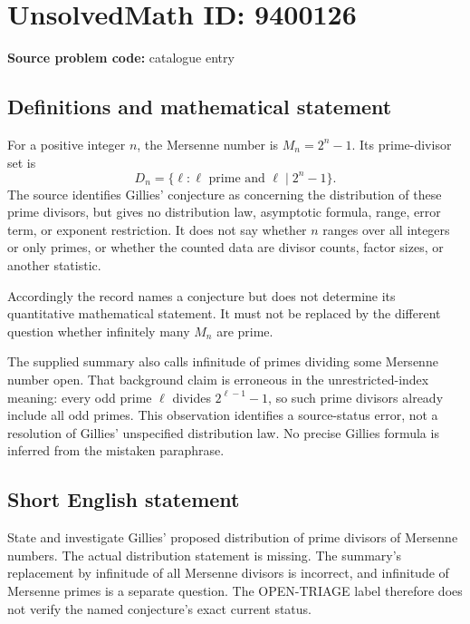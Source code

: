 \documentclass[11pt]{article}
\begin{document}
\section*{UnsolvedMath ID: 9400126}
\textbf{Source problem code:} catalogue entry
\subsection{Definitions and mathematical statement}
For a positive integer $n$, the Mersenne number is $M_n=2^n-1$. Its prime-divisor set is
\[
 D_n=\{\ell:\ell\text{ prime and }\ell\mid2^n-1\}.
\]
The source identifies Gillies' conjecture as concerning the distribution of these prime divisors, but gives no distribution law, asymptotic formula, range, error term, or exponent restriction. It does not say whether $n$ ranges over all integers or only primes, or whether the counted data are divisor counts, factor sizes, or another statistic.

Accordingly the record names a conjecture but does not determine its quantitative mathematical statement. It must not be replaced by the different question whether infinitely many $M_n$ are prime.

The supplied summary also calls infinitude of primes dividing some Mersenne number open. That background claim is erroneous in the unrestricted-index meaning: every odd prime $\ell$ divides $2^{\ell-1}-1$, so such prime divisors already include all odd primes. This observation identifies a source-status error, not a resolution of Gillies' unspecified distribution law. No precise Gillies formula is inferred from the mistaken paraphrase.
\subsection{Short English statement}
State and investigate Gillies' proposed distribution of prime divisors of Mersenne numbers. The actual distribution statement is missing. The summary's replacement by infinitude of all Mersenne divisors is incorrect, and infinitude of Mersenne primes is a separate question. The OPEN-TRIAGE label therefore does not verify the named conjecture's exact current status.
\end{document}
